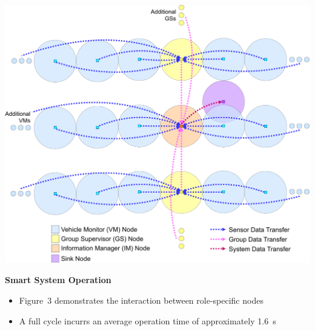 \documentclass[landscape,a1paper,fontscale=0.45]{baposter} %
\newcommand{\compresslist}{ %
\setlength{\itemsep}{1pt}
\setlength{\parskip}{0pt}
\setlength{\parsep}{0pt}
}
\begin{document}
\begin{poster}
{\begin{multicols}{2}
		\begin{center}
			\includegraphics[width=0.8\columnwidth]{mesh-cropped}
		\end{center}
	
		\textbf{Smart System Operation}
			\begin{itemize}[leftmargin=13pt]\compresslist
				\item Figure~3 demonstrates the interaction between role-specific nodes
				\item A full cycle incurrs an average operation time of approximately 1.6~s
			\end{itemize}
		
		\vspace{0.5pt}
		

\end{multicols}}
\end{poster}
\end{document}
